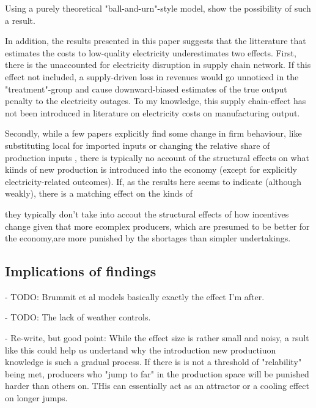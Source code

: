 \documentclass[11pt]{article}
\begin{document}
Using a purely theoretical "ball-and-urn"-style model, \cite{brummitt_contagious_2017} show the possibility of such a result. 

In addition, the results presented in this paper suggests that the litterature that estimates the costs to low-quality electricity underestimates two effects. First, there is the unaccounted for electricity disruption in supply chain network. If this effect not included, a supply-driven loss in revenues would go unnoticed in the "treatment"-group and cause downward-biased estimates of the true output penalty to the electricity outages. To my knowledge, this supply chain-effect has not been introduced in literature on electricity costs on manufacturing output.

Secondly, while a few papers explicitly find some change in firm behaviour, like substituting local for imported inputs \cite{fisher-vanden_electricity_2015} or changing the relative share of production inputs \citep{abeberese_electricity_2017}, there is typically no account of the structural effects on what kiinds of new production is introduced into the economy (except for explicitly electricity-related outcomes). If, as the results here seems to indicate (although weakly), there is a matching effect on the kinds of 



they typically don't take into accout the structural effects of how incentives change given that more ecomplex producers, which are presumed to be better for the economy,are more punished by the shortages than simpler undertakings.
\subsection{Implications of findings}%
\label{sub:findings}



- TODO: Brummit et al models basically exactly the effect I'm after.


- TODO: The lack of weather controls.


- Re-write, but good point: While the effect size is rather small and noisy, a rsult like this could help us undertand why the introduction new productiuon knowledge is such a gradual process. If there is is not a threshold of "relability" being met, producers who "jump to far" in the production space will be punished harder than others on. THis can essentially act as an attractor or a cooling effect on longer jumps.
\end{document}
